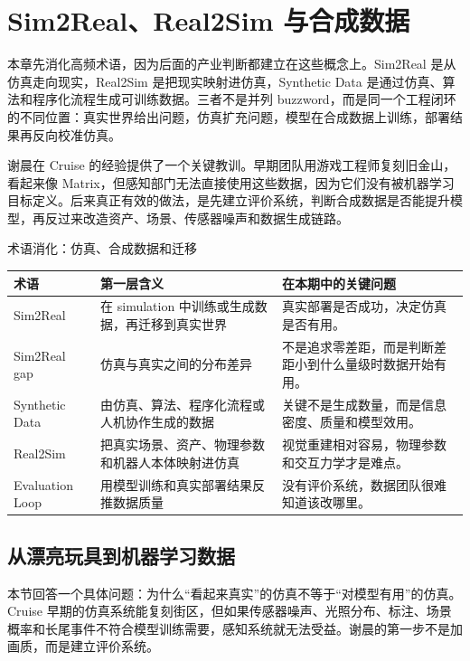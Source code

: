 \documentclass[a4paper]{article}
\begin{document}
\section{Sim2Real、Real2Sim 与合成数据}

本章先消化高频术语，因为后面的产业判断都建立在这些概念上。Sim2Real 是从仿真走向现实，Real2Sim 是把现实映射进仿真，Synthetic Data 是通过仿真、算法和程序化流程生成可训练数据。三者不是并列 buzzword，而是同一个工程闭环的不同位置：真实世界给出问题，仿真扩充问题，模型在合成数据上训练，部署结果再反向校准仿真。

谢晨在 Cruise 的经验提供了一个关键教训。早期团队用游戏工程师复刻旧金山，看起来像 Matrix，但感知部门无法直接使用这些数据，因为它们没有被机器学习目标定义。后来真正有效的做法，是先建立评价系统，判断合成数据是否能提升模型，再反过来改造资产、场景、传感器噪声和数据生成链路。

\begin{knowledgebox}{术语消化：仿真、合成数据和迁移}
\begin{tabularx}{\textwidth}{p{}p{}X}
\toprule
术语 & 第一层含义 & 在本期中的关键问题 \\
\midrule
Sim2Real & 在 simulation 中训练或生成数据，再迁移到真实世界 & 真实部署是否成功，决定仿真是否有用。 \\
Sim2Real gap & 仿真与真实之间的分布差异 & 不是追求零差距，而是判断差距小到什么量级时数据开始有用。 \\
Synthetic Data & 由仿真、算法、程序化流程或人机协作生成的数据 & 关键不是生成数量，而是信息密度、质量和模型效用。 \\
Real2Sim & 把真实场景、资产、物理参数和机器人本体映射进仿真 & 视觉重建相对容易，物理参数和交互力学才是难点。 \\
Evaluation Loop & 用模型训练和真实部署结果反推数据质量 & 没有评价系统，数据团队很难知道该改哪里。 \\
\bottomrule
\end{tabularx}
\end{knowledgebox}

\subsection{从漂亮玩具到机器学习数据}

本节回答一个具体问题：为什么“看起来真实”的仿真不等于“对模型有用”的仿真。Cruise 早期的仿真系统能复刻街区，但如果传感器噪声、光照分布、标注、场景概率和长尾事件不符合模型训练需要，感知系统就无法受益。谢晨的第一步不是加画质，而是建立评价系统。
\end{document}
